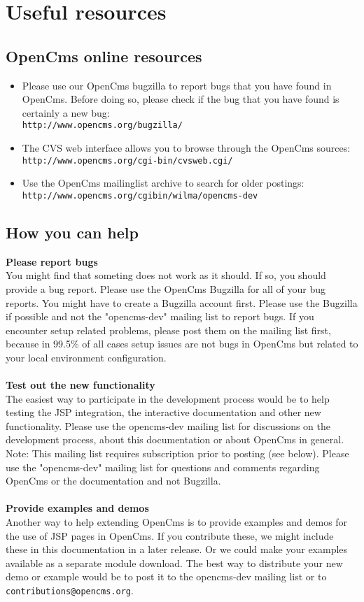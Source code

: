 \chapter{Useful resources}

\section{OpenCms online resources}

\begin{itemize}
\item Please use our OpenCms bugzilla to report bugs that you have found in OpenCms. 
Before doing so, please check if the bug that you have found is certainly a new bug:\\
{\tt http://www.opencms.org/bugzilla/}
\item The CVS web interface allows you to browse through the OpenCms sources:\\
{\tt http://www.opencms.org/cgi-bin/cvsweb.cgi/}
\item Use the OpenCms mailinglist archive to search for older postings:\\
{\tt http://www.opencms.org/cgibin/wilma/opencms-dev}
\end{itemize}

\section{How you can help}
{\bf Please report bugs}\\
You might find that someting does not work as it should. If so, you should provide a bug report. 
Please use the OpenCms Bugzilla for all of your bug reports. You might have to create a Bugzilla 
account first. Please use the Bugzilla if possible and not the "opencms-dev" mailing list to report 
bugs. If you encounter setup related problems, please post them on the mailing list first, because 
in 99.5\% of all cases setup issues are not bugs in OpenCms but related to your local environment
configuration.\\
\\
{\bf Test out the new functionality}\\
The easiest way to participate in the development process would be to help testing the JSP integration, 
the interactive documentation and other new functionality. Please use the opencms-dev mailing list for 
discussions on the development process, about this documentation or about OpenCms in general. Note: This 
mailing list requires subscription prior to posting (see below). Please use the "opencms-dev" mailing list 
for questions and comments regarding OpenCms or the documentation and not Bugzilla.\\
\\
{\bf Provide examples and demos}\\
Another way to help extending OpenCms is to provide examples and demos for the use of JSP pages in OpenCms. 
If you contribute these, we might include these in this documentation in a later release. Or we could make 
your examples available as a separate module download. The best way to distribute your new demo or example 
would be to post it to the opencms-dev mailing list or to {\tt contributions@opencms.org}.

